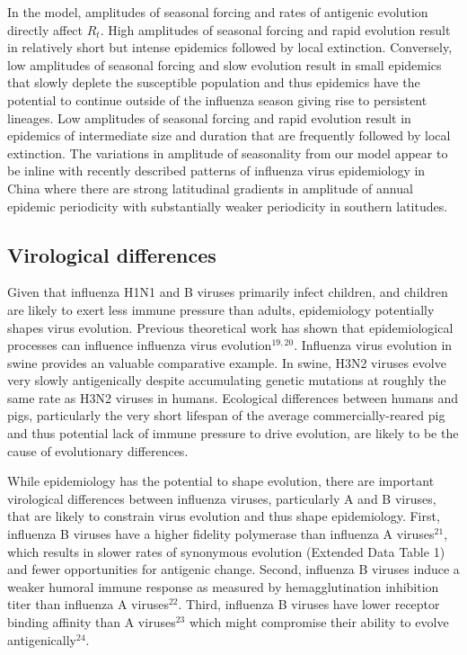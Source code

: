 \documentclass[11pt,oneside,letterpaper]{article}
\begin{document}
In the model, amplitudes of seasonal forcing and rates of antigenic evolution directly affect $R_{t}$.
High amplitudes of seasonal forcing and rapid evolution result in relatively short but intense epidemics followed by local extinction.
Conversely, low amplitudes of seasonal forcing and slow evolution result in small epidemics that slowly deplete the susceptible population and thus epidemics have the potential to continue outside of the influenza season giving rise to persistent lineages.
Low amplitudes of seasonal forcing and rapid evolution result in epidemics of intermediate size and duration that are frequently followed by local extinction.
The variations in amplitude of seasonality from our model appear to be inline with recently described patterns of influenza virus epidemiology in China \cite{Yu13} where there are strong latitudinal gradients in amplitude of annual epidemic periodicity with substantially weaker periodicity in southern latitudes.

\subsection*{Virological differences}

Given that influenza H1N1 and B viruses primarily infect children, and children are likely to exert less immune pressure than adults, epidemiology potentially shapes virus evolution.
Previous theoretical work has shown that epidemiological processes can influence influenza virus evolution$^{19,20}$.  
Influenza virus evolution in swine provides an valuable comparative example.
In swine, H3N2 viruses evolve very slowly antigenically despite accumulating genetic mutations at roughly the same rate as H3N2 viruses in humans\cite{deJong07}.
Ecological differences between humans and pigs, particularly the very short lifespan of the average commercially-reared pig and thus potential lack of immune pressure to drive evolution, are likely to be the cause of evolutionary differences.

While epidemiology has the potential to shape evolution, there are important virological differences between influenza viruses, particularly A and B viruses, that are likely to constrain virus evolution and thus shape epidemiology.
First, influenza B viruses have a higher fidelity polymerase than influenza A viruses$^{21}$, which results in slower rates of synonymous evolution (Extended Data Table 1) and fewer opportunities for antigenic change.
Second, influenza B viruses induce a weaker humoral immune response as measured by hemagglutination inhibition titer than influenza A viruses$^{22}$.
Third, influenza B viruses have lower receptor binding affinity than A viruses$^{23}$ which might compromise their ability to evolve antigenically$^{24}$.
\end{document}
